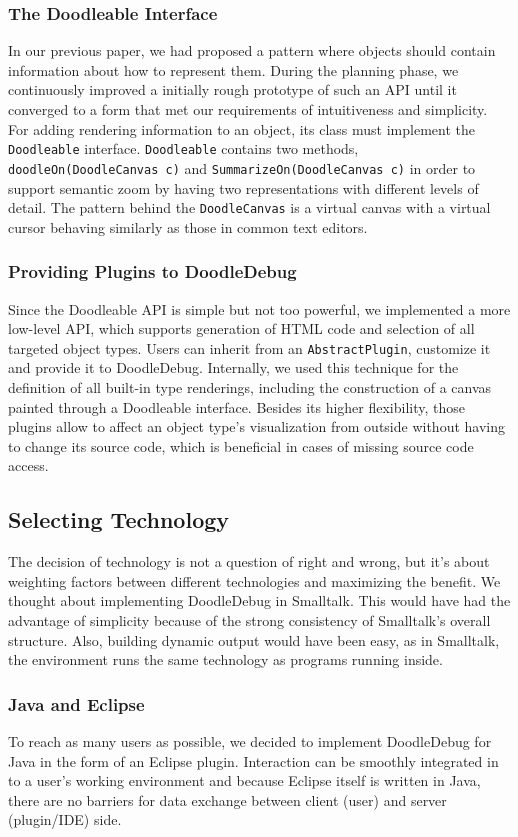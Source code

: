 \documentclass[english]{acm_proc_article-sp}
\begin{document}
\subsubsection{The Doodleable Interface}
In our previous paper, we had proposed a pattern where objects should contain information about how to represent them. During the planning phase, we continuously improved a initially rough prototype of such an API until it converged to a form that met our requirements of intuitiveness and simplicity. For adding rendering information to an object, its class must implement the \verb.Doodleable. interface. \verb.Doodleable. contains two methods, \verb.doodleOn(DoodleCanvas c). and \verb.SummarizeOn(DoodleCanvas c). in order to support semantic zoom by having two representations with different levels of detail. The pattern behind the \verb.DoodleCanvas. is a virtual canvas with a virtual cursor behaving similarly as those in common text editors.

\subsubsection{Providing Plugins to DoodleDebug}
Since the Doodleable API is simple but not too powerful, we implemented a more low-level API, which supports generation of HTML code and selection of all targeted object types. Users can inherit from an \verb.AbstractPlugin., customize it and provide it to DoodleDebug. Internally, we used this technique for the definition of all built-in type renderings, including the construction of a canvas painted through a Doodleable interface. Besides its higher flexibility, those plugins allow to affect an object type's visualization from outside without having to change its source code, which is beneficial in cases of missing source code access.

\subsection{Selecting Technology}
The decision of technology is not a question of right and wrong, but it's about weighting factors between different technologies and maximizing the benefit. We thought about implementing DoodleDebug in Smalltalk. This would have had the advantage of simplicity because of the strong consistency of Smalltalk's overall structure. Also, building dynamic output would have been easy, as in Smalltalk, the environment runs the same technology as programs running inside.

\subsubsection{Java and Eclipse}
To reach as many users as possible, we decided to implement DoodleDebug for Java in the form of an Eclipse plugin. Interaction can be smoothly integrated in to a user's working environment and because Eclipse itself is written in Java, there are no barriers for data exchange between client (user) and server (plugin/IDE) side.
\end{document}
